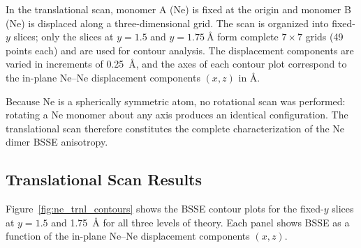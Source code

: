 In the translational scan, monomer A (Ne) is fixed at the origin and
monomer B (Ne) is displaced along a three-dimensional grid. The scan
is organized into fixed-$y$ slices; only the slices at $y = 1.5$ and
$y = \SI{1.75}{\angstrom}$ form complete $7 \times 7$ grids (49 points
each) and are used for contour analysis. The displacement components
are varied in increments of \SI{0.25}{\angstrom}, and the axes of each
contour plot correspond to the in-plane Ne--Ne displacement components
$(x, z)$ in \AA.

Because Ne is a spherically symmetric atom, no rotational scan was
performed: rotating a Ne monomer about any axis produces an identical
configuration. The translational scan therefore constitutes the
complete characterization of the Ne dimer BSSE anisotropy.

\subsection{Translational Scan Results}

Figure~\ref{fig:ne_trnl_contours} shows the BSSE contour plots for the
fixed-$y$ slices at $y = 1.5$ and \SI{1.75}{\angstrom} for all three
levels of theory. Each panel shows BSSE as a function of the in-plane
Ne--Ne displacement components $(x, z)$.

